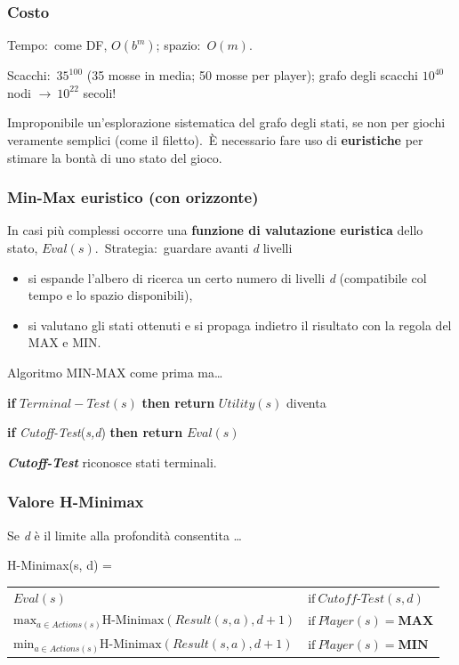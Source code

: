 \subsubsection{Costo}

Tempo:\ come DF, $O(b^m)$; spazio:\ $O(m)$.

Scacchi:\ $35^{100}$ (35 mosse in media; 50 mosse per player); grafo degli scacchi $10^{40}$ nodi $\rightarrow\ 10^{22}$ secoli!

Improponibile un'esplorazione sistematica del grafo degli stati, se non per giochi veramente semplici (come il filetto).\
È necessario fare uso di \textbf{euristiche} per stimare la bontà di uno stato del gioco.

\subsubsection{Min-Max euristico (con orizzonte)}

In casi più complessi occorre una \textbf{funzione di valutazione euristica} dello stato, $Eval(s)$.\
Strategia:\ guardare avanti \textit{d} livelli
\begin{itemize}
	\item si espande l'albero di ricerca un certo numero di livelli \textit{d} (compatibile col tempo e lo spazio disponibili),
	\item si valutano gli stati ottenuti e si propaga indietro il risultato con la regola del MAX e MIN.
\end{itemize}
Algoritmo MIN-MAX come prima ma\dots

\begin{flushleft}
	\textbf{if} $Terminal-Test(s)$ \textbf{then return} $Utility(s)$ diventa

	\textbf{if} \textit{Cutoff-Test}(\textit{s,d}) \textbf{then return} $Eval(s)$
\end{flushleft}
\textbf{\textit{Cutoff-Test}} riconosce stati terminali.

\subsubsection{Valore H-Minimax}
Se \textit{d} è il limite alla profondità consentita …

\noindent H-Minimax(s, d) =

\begin{table}[H]
	\centering
	\begin{tabular}{l l}
		$Eval(s)$                                                                                  & $\mathrm{if}\ \mathit{Cutoff\textrm{-}Test}(s,d)$         \\
		$\mathrm{max}_{a \in Actions(s)} \mathrm{H\textrm{-}Minimax}(\mathit{Result}(s, a), d +1)$ & $\mathrm{if}\ \mathit{Player}(s) = \mathrm{\mathbf{MAX}}$ \\
		$\mathrm{min}_{a \in Actions(s)} \mathrm{H\textrm{-}Minimax}(\mathit{Result}(s, a), d +1)$ & $\mathrm{if}\ \mathit{Player}(s) = \mathrm{\mathbf{MIN}}$ \\
	\end{tabular}
\end{table}

